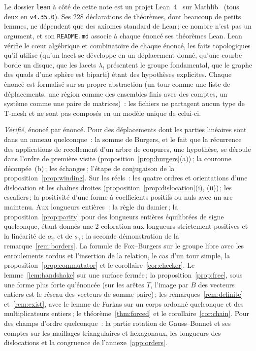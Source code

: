 \documentclass[11pt,a4paper]{article}
\newcommand{\shift}{s}
\begin{document}
Le dossier \texttt{lean} à côté de cette note est un projet
Lean~4~\cite{demoura2021lean4} sur Mathlib~\cite{mathlib2020} (tous deux en
\texttt{v4.35.0}). Ses $228$ déclarations de théorèmes, dont beaucoup de
petits lemmes, ne dépendent que des axiomes standard de Lean\,; ce nombre
n'est pas un argument, et son \texttt{README.md} associe à chaque énoncé ses
théorèmes Lean. Lean vérifie le cœur algébrique et combinatoire de chaque
énoncé, les faits topologiques qu'il utilise (qu'un lacet se développe en un
déplacement donné, qu'une courbe borde un disque, que les lacets $\lambda_i$
présentent le groupe fondamental, que le graphe des quads d'une sphère est
biparti) étant des hypothèses explicites. Chaque énoncé est formalisé sur sa
propre abstraction (un tour comme une liste de déplacements, une région comme
des ensembles finis avec des comptes, un système comme une paire de
matrices)~: les fichiers ne partagent aucun type de T-mesh et ne sont pas
composés en un modèle unique de celui-ci.

\emph{Vérifié}, énoncé par énoncé. Pour des déplacements dont les parties
linéaires sont dans un anneau quelconque~: la somme de Burgers, et le fait que
la récurrence des applications de recollement d'un arbre de coupures, une
hypothèse, se déroule dans l'ordre de première visite
(proposition~\ref{prop:burgers}(a))\,; la couronne découpée~(b)\,; les
échanges\,; l'étape de conjugaison de la proposition~\ref{prop:winding}. Sur
les réels~: les quatre ordres et orientations d'une dislocation et les
chaînes droites (proposition~\ref{prop:dislocation}(i), (ii))\,; les
escaliers\,; la positivité d'une forme à coefficients positifs ou nuls avec un
arc maintenu. Aux longueurs entières~: la règle du damier\,; la
proposition~\ref{prop:parity} pour des longueurs entières équilibrées de signe
quelconque, étant donnés une 2-coloration aux longueurs strictement positives
et la linéarité de $\alpha_\gamma$ et de $\shift_\gamma$\,; la seconde
démonstration de la remarque~\ref{rem:borders}. La formule de Fox--Burgers
sur le groupe libre avec les enroulements tordus et l'insertion de la
relation, le cas d'un tour simple, la proposition~\ref{prop:commutator} et le
corollaire~\ref{cor:checker}. Le lemme~\ref{lem:handshake} sur une surface
fermée\,; la proposition~\ref{prop:free}, sous une forme plus forte
qu'énoncée (sur les arêtes $T$, l'image par $B$ des vecteurs entiers est le
réseau des vecteurs de somme paire)\,; les remarques~\ref{rem:definite}
et~\ref{rem:exist}, avec le lemme de Farkas sur un corps ordonné quelconque et
des multiplicateurs entiers\,; le théorème~\ref{thm:forced} et le
corollaire~\ref{cor:chain}. Pour des champs d'ordre quelconque~: la partie
rotation de Gauss--Bonnet et ses comptes sur les maillages triangulaires et
hexagonaux, les longueurs des dislocations et la congruence de
l'annexe~\ref{app:orders}.
\end{document}
